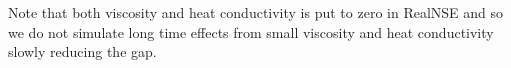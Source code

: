 Note that both viscosity and heat conductivity is put to zero in RealNSE and so we do not simulate long time effects from small viscosity and heat conductivity slowly reducing
the gap.
 




 







 




